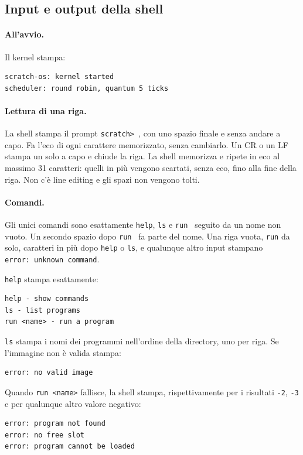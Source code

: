 \subsection{Input e output della shell}

\paragraph{All'avvio.} Il kernel stampa:
\begin{lstlisting}
scratch-os: kernel started
scheduler: round robin, quantum 5 ticks
\end{lstlisting}

\paragraph{Lettura di una riga.} La shell stampa il prompt \texttt{scratch> }, con uno spazio finale e senza andare a capo. Fa l'eco di ogni carattere memorizzato, senza cambiarlo. Un CR o un LF stampa un solo a capo e chiude la riga. La shell memorizza e ripete in eco al massimo 31 caratteri: quelli in più vengono scartati, senza eco, fino alla fine della riga. Non c'è line editing e gli spazi non vengono tolti.

\paragraph{Comandi.} Gli unici comandi sono esattamente \texttt{help}, \texttt{ls} e \texttt{run } seguito da un nome non vuoto. Un secondo spazio dopo \texttt{run } fa parte del nome. Una riga vuota, \texttt{run} da solo, caratteri in più dopo \texttt{help} o \texttt{ls}, e qualunque altro input stampano \texttt{error:\ unknown command}.

\texttt{help} stampa esattamente:
\begin{lstlisting}
help - show commands
ls - list programs
run <name> - run a program
\end{lstlisting}

\texttt{ls} stampa i nomi dei programmi nell'ordine della directory, uno per riga. Se l'immagine non è valida stampa:
\begin{lstlisting}
error: no valid image
\end{lstlisting}

Quando \texttt{run <name>} fallisce, la shell stampa, rispettivamente per i risultati \texttt{-2}, \texttt{-3} e per qualunque altro valore negativo:
\begin{lstlisting}
error: program not found
error: no free slot
error: program cannot be loaded
\end{lstlisting}

